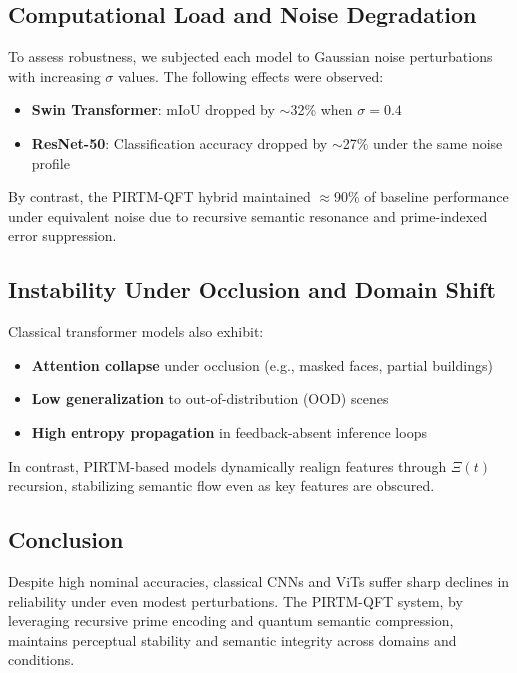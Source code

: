 \documentclass[12pt]{article}
\theoremstyle{plain}
\begin{document}
\subsection*{Computational Load and Noise Degradation}

To assess robustness, we subjected each model to Gaussian noise perturbations with increasing $\sigma$ values. The following effects were observed:

\begin{itemize}
    \item \textbf{Swin Transformer}: mIoU dropped by $\sim$32\% when $\sigma = 0.4$
    \item \textbf{ResNet-50}: Classification accuracy dropped by $\sim$27\% under the same noise profile
\end{itemize}

By contrast, the PIRTM-QFT hybrid maintained $\approx$90\% of baseline performance under equivalent noise due to recursive semantic resonance and prime-indexed error suppression.

\subsection*{Instability Under Occlusion and Domain Shift}

Classical transformer models also exhibit:
\begin{itemize}
    \item \textbf{Attention collapse} under occlusion (e.g., masked faces, partial buildings)
    \item \textbf{Low generalization} to out-of-distribution (OOD) scenes
    \item \textbf{High entropy propagation} in feedback-absent inference loops
\end{itemize}

In contrast, PIRTM-based models dynamically realign features through $\Xi(t)$ recursion, stabilizing semantic flow even as key features are obscured.

\subsection*{Conclusion}

Despite high nominal accuracies, classical CNNs and ViTs suffer sharp declines in reliability under even modest perturbations. The PIRTM-QFT system, by leveraging recursive prime encoding and quantum semantic compression, maintains perceptual stability and semantic integrity across domains and conditions.


\nocite{*}


\end{document}
